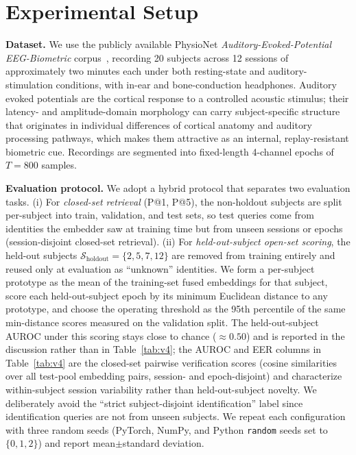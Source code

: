 \documentclass{IEEEtran}
\begin{document}
\section{Experimental Setup}
\textbf{Dataset.} We use the publicly available PhysioNet
\emph{Auditory-Evoked-Potential EEG-Biometric} corpus~\cite{b11},
recording 20 subjects across 12 sessions of approximately two minutes
each under both resting-state and auditory-stimulation conditions, with
in-ear and bone-conduction headphones. Auditory evoked potentials are
the cortical response to a controlled acoustic stimulus; their latency-
and amplitude-domain morphology can carry subject-specific structure that
originates in individual differences of cortical anatomy and auditory
processing pathways, which makes them attractive as an internal,
replay-resistant biometric cue. Recordings are segmented into
fixed-length 4-channel epochs of $T=800$ samples.

\textbf{Evaluation protocol.} We adopt a hybrid protocol that separates
two evaluation tasks. (i) For \emph{closed-set retrieval} (P@1, P@5),
the non-holdout subjects are split per-subject into train, validation,
and test sets, so test queries come from identities the embedder saw at
training time but from unseen sessions or epochs (session-disjoint
closed-set retrieval). (ii) For \emph{held-out-subject open-set scoring},
the held-out subjects $\mathcal{S}_{\mathrm{holdout}}=\{2,5,7,12\}$ are
removed from training entirely and reused only at evaluation as
``unknown'' identities. We form a per-subject prototype as the mean of
the training-set fused embeddings for that subject, score each
held-out-subject epoch by its minimum Euclidean distance to any
prototype, and choose the operating threshold as the 95th percentile of
the same min-distance scores measured on the validation split. The
held-out-subject AUROC under this scoring stays close to chance
($\approx 0.50$) and is reported in the discussion rather than in
Table~\ref{tab:v4}; the AUROC and EER columns in Table~\ref{tab:v4} are
the closed-set pairwise verification scores (cosine similarities over all
test-pool embedding pairs, session- and epoch-disjoint) and characterize
within-subject session variability rather than held-out-subject novelty.
We deliberately avoid the ``strict subject-disjoint identification''
label since identification queries are not from unseen subjects. We
repeat each configuration with three random seeds (PyTorch, NumPy, and
Python \texttt{random} seeds set to $\{0, 1, 2\}$) and report
mean$\pm$standard deviation.
\end{document}
